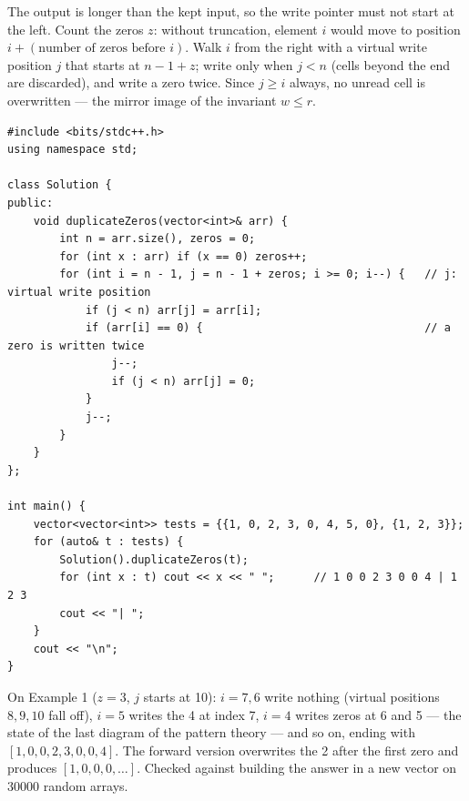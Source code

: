 \begin{solutionbox}
The output is longer than the kept input, so the write pointer must not start at the left. Count the zeros $z$: without truncation, element $i$ would move to position $i + (\text{number of zeros before } i)$. Walk $i$ from the right with a virtual write position $j$ that starts at $n - 1 + z$; write only when $j < n$ (cells beyond the end are discarded), and write a zero twice. Since $j \ge i$ always, no unread cell is overwritten --- the mirror image of the invariant $w \le r$.
\begin{lstlisting}[style=cpp]
#include <bits/stdc++.h>
using namespace std;

class Solution {
public:
    void duplicateZeros(vector<int>& arr) {
        int n = arr.size(), zeros = 0;
        for (int x : arr) if (x == 0) zeros++;
        for (int i = n - 1, j = n - 1 + zeros; i >= 0; i--) {   // j: virtual write position
            if (j < n) arr[j] = arr[i];
            if (arr[i] == 0) {                                  // a zero is written twice
                j--;
                if (j < n) arr[j] = 0;
            }
            j--;
        }
    }
};

int main() {
    vector<vector<int>> tests = {{1, 0, 2, 3, 0, 4, 5, 0}, {1, 2, 3}};
    for (auto& t : tests) {
        Solution().duplicateZeros(t);
        for (int x : t) cout << x << " ";      // 1 0 0 2 3 0 0 4 | 1 2 3
        cout << "| ";
    }
    cout << "\n";
}
\end{lstlisting}
On Example 1 ($z = 3$, $j$ starts at 10): $i = 7, 6$ write nothing (virtual positions $8, 9, 10$ fall off), $i = 5$ writes the 4 at index 7, $i = 4$ writes zeros at 6 and 5 --- the state of the last diagram of the pattern theory --- and so on, ending with $[1, 0, 0, 2, 3, 0, 0, 4]$. The forward version overwrites the 2 after the first zero and produces $[1, 0, 0, 0, \dots]$. Checked against building the answer in a new vector on 30000 random arrays.
\end{solutionbox}

